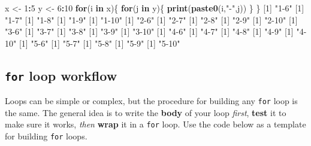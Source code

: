 \documentclass[]{book}
\newenvironment{Shaded}{\begin{snugshade}}{\end{snugshade}}
\newcommand{\ControlFlowTok}[1]{\textcolor[rgb]{0.13,0.29,0.53}{\textbf{#1}}}
\newcommand{\DecValTok}[1]{\textcolor[rgb]{0.00,0.00,0.81}{#1}}
\newcommand{\KeywordTok}[1]{\textcolor[rgb]{0.13,0.29,0.53}{\textbf{#1}}}
\newcommand{\NormalTok}[1]{#1}
\newcommand{\OperatorTok}[1]{\textcolor[rgb]{0.81,0.36,0.00}{\textbf{#1}}}
\newcommand{\StringTok}[1]{\textcolor[rgb]{0.31,0.60,0.02}{#1}}
\begin{document}
\begin{Shaded}
\begin{Highlighting}[]
\NormalTok{x <-}\StringTok{ }\DecValTok{1}\OperatorTok{:}\DecValTok{5}
\NormalTok{y <-}\StringTok{ }\DecValTok{6}\OperatorTok{:}\DecValTok{10}
\ControlFlowTok{for}\NormalTok{(i }\ControlFlowTok{in}\NormalTok{ x)\{}
  \ControlFlowTok{for}\NormalTok{(j }\ControlFlowTok{in}\NormalTok{ y)\{}
  \KeywordTok{print}\NormalTok{(}\KeywordTok{paste0}\NormalTok{(i,}\StringTok{"-"}\NormalTok{,j))}
\NormalTok{  \}}
\NormalTok{\}}
\NormalTok{[}\DecValTok{1}\NormalTok{] }\StringTok{"1-6"}
\NormalTok{[}\DecValTok{1}\NormalTok{] }\StringTok{"1-7"}
\NormalTok{[}\DecValTok{1}\NormalTok{] }\StringTok{"1-8"}
\NormalTok{[}\DecValTok{1}\NormalTok{] }\StringTok{"1-9"}
\NormalTok{[}\DecValTok{1}\NormalTok{] }\StringTok{"1-10"}
\NormalTok{[}\DecValTok{1}\NormalTok{] }\StringTok{"2-6"}
\NormalTok{[}\DecValTok{1}\NormalTok{] }\StringTok{"2-7"}
\NormalTok{[}\DecValTok{1}\NormalTok{] }\StringTok{"2-8"}
\NormalTok{[}\DecValTok{1}\NormalTok{] }\StringTok{"2-9"}
\NormalTok{[}\DecValTok{1}\NormalTok{] }\StringTok{"2-10"}
\NormalTok{[}\DecValTok{1}\NormalTok{] }\StringTok{"3-6"}
\NormalTok{[}\DecValTok{1}\NormalTok{] }\StringTok{"3-7"}
\NormalTok{[}\DecValTok{1}\NormalTok{] }\StringTok{"3-8"}
\NormalTok{[}\DecValTok{1}\NormalTok{] }\StringTok{"3-9"}
\NormalTok{[}\DecValTok{1}\NormalTok{] }\StringTok{"3-10"}
\NormalTok{[}\DecValTok{1}\NormalTok{] }\StringTok{"4-6"}
\NormalTok{[}\DecValTok{1}\NormalTok{] }\StringTok{"4-7"}
\NormalTok{[}\DecValTok{1}\NormalTok{] }\StringTok{"4-8"}
\NormalTok{[}\DecValTok{1}\NormalTok{] }\StringTok{"4-9"}
\NormalTok{[}\DecValTok{1}\NormalTok{] }\StringTok{"4-10"}
\NormalTok{[}\DecValTok{1}\NormalTok{] }\StringTok{"5-6"}
\NormalTok{[}\DecValTok{1}\NormalTok{] }\StringTok{"5-7"}
\NormalTok{[}\DecValTok{1}\NormalTok{] }\StringTok{"5-8"}
\NormalTok{[}\DecValTok{1}\NormalTok{] }\StringTok{"5-9"}
\NormalTok{[}\DecValTok{1}\NormalTok{] }\StringTok{"5-10"}
\end{Highlighting}
\end{Shaded}

\hypertarget{for-loop-workflow}{%
\subsection*{\texorpdfstring{\texttt{for} loop workflow}{for loop workflow}}\label{for-loop-workflow}}

Loops can be simple or complex, but the procedure for building any \texttt{for} loop is the same. The general idea is to write the \textbf{body} of your loop \emph{first}, \textbf{test} it to make sure it works, \emph{then} \textbf{wrap} it in a \texttt{for} loop. Use the code below as a template for building \texttt{for} loops.
\end{document}
